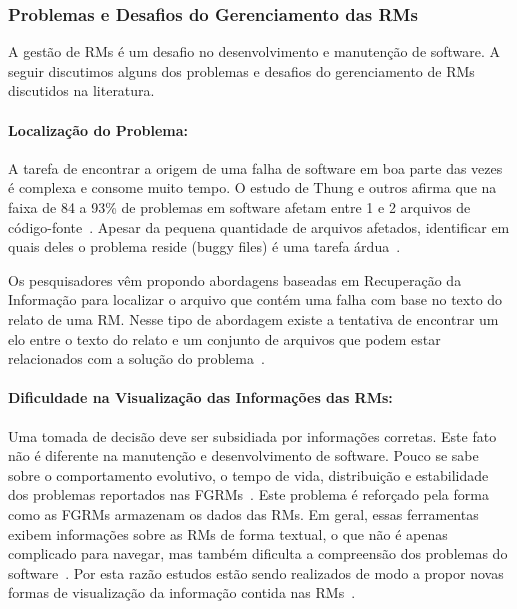 \subsubsection{Problemas e Desafios do Gerenciamento das RMs}
\label{ssub:problemas_relacionadas_rm}

A gestão de RMs é um desafio no desenvolvimento e manutenção de software.  A
seguir discutimos alguns dos problemas e desafios do gerenciamento de RMs
discutidos na literatura.

\paragraph{Localização do Problema:}

A tarefa de encontrar a origem de uma falha de software em boa parte das vezes é
complexa e consome muito tempo. O estudo de Thung e outros afirma que na faixa
de 84 a 93\% de problemas em software afetam entre 1 e 2 arquivos de
código-fonte~\cite{thung2012faults}. Apesar da pequena quantidade de arquivos
afetados, identificar em quais deles o problema reside (buggy files) é uma
tarefa árdua~\cite{Thung:2014:BIT:2635868.2661678}.

Os pesquisadores vêm propondo abordagens baseadas em Recuperação da Informação
para localizar o arquivo que contém uma falha com base no texto do relato de uma
RM\@. Nesse tipo de abordagem existe a tentativa de encontrar um elo entre o
texto do relato e um conjunto de arquivos que podem estar relacionados com a
solução do problema~\cite{Wong:2014:BBF:2705615.2706096}.

\paragraph{Dificuldade na Visualização das Informações das RMs:}

Uma tomada de decisão deve ser subsidiada por informações corretas. Este fato
não é diferente na manutenção e desenvolvimento de software. Pouco se sabe sobre
o comportamento evolutivo, o tempo de vida, distribuição e estabilidade dos
problemas reportados nas FGRMs~\cite{hora2012bug}. Este problema é reforçado
pela forma como as FGRMs armazenam os dados das RMs. Em geral, essas ferramentas
exibem informações sobre as RMs de forma textual, o que não é apenas complicado
para navegar, mas também dificulta a compreensão dos problemas do
software~\cite{dal2014bug}. Por esta razão estudos estão sendo realizados de
modo a propor novas formas de visualização da informação contida nas
RMs~\cite{takama2013application,hora2012bug}.

